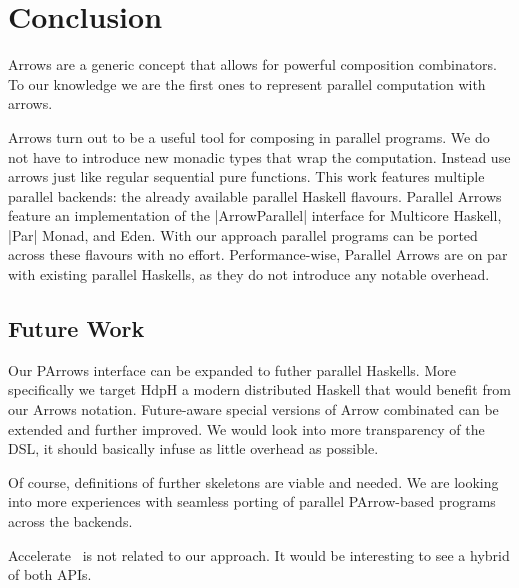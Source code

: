 
\section{Conclusion}
\label{sec:conclusion}
Arrows are a generic concept that allows for powerful composition combinators. To our knowledge we are the first ones to represent parallel computation with arrows. \done

Arrows turn out to be a useful tool for composing in parallel programs. We do not have to introduce new monadic types that wrap the computation. Instead use arrows just like regular sequential pure functions. 
%
This work features multiple parallel backends: the already available parallel Haskell flavours. Parallel Arrows feature an implementation of the |ArrowParallel| interface for Multicore Haskell, |Par| Monad, and Eden. With our approach parallel programs can be ported across these flavours with no effort.
%
%
Performance-wise, Parallel Arrows are on par with existing parallel Haskells, as they do not introduce any notable overhead.





\subsection{Future Work}
\label{sec:future-work}

Our PArrows interface can be expanded to futher parallel Haskells. More specifically we target HdpH \cite{Maier:2014:HDS:2775050.2633363} a modern distributed Haskell that would benefit from our Arrows notation. Future-aware special versions of Arrow combinated can be extended and further improved. We would look into more transparency of the DSL, it should basically infuse as little overhead as possible.

Of course, definitions of further skeletons are viable and needed. We are looking into more experiences with seamless porting of parallel PArrow-based programs across the backends.

Accelerate~\cite{Chakravarty:2011:AHA:1926354.1926358} is not related to our approach. It would be interesting to see a hybrid of both APIs.

